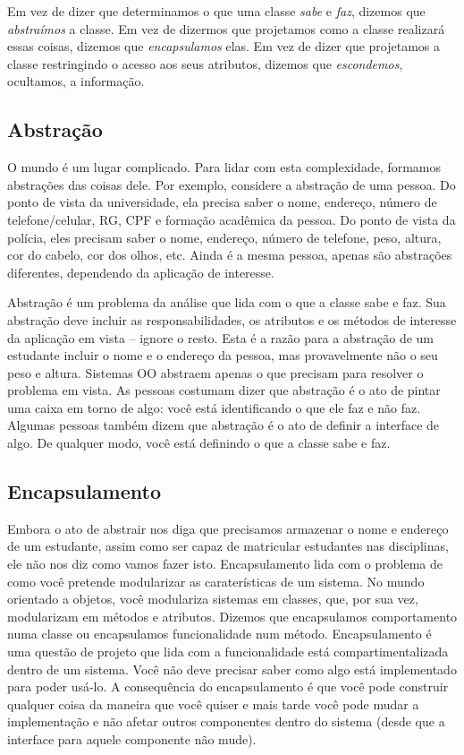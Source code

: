 Em vez de dizer que determinamos o que uma classe \textit{sabe} e \textit{faz}, dizemos que \emph{abstraímos} a classe. Em vez de dizermos que projetamos como a classe realizará essas coisas, dizemos que \emph{encapsulamos} elas. Em vez de dizer que projetamos a classe restringindo o acesso aos seus atributos, dizemos que \emph{escondemos}, ocultamos, a informação.

\subsection{Abstração}

O mundo é um lugar complicado. Para lidar com esta complexidade, formamos abstrações das coisas dele. Por exemplo, considere a abstração de uma pessoa. Do ponto de vista da universidade, ela precisa saber o nome, endereço, número de telefone/celular, RG, CPF e formação acadêmica da pessoa. Do ponto de vista da polícia, eles precisam saber o nome, endereço, número de telefone, peso, altura, cor do cabelo, cor dos olhos, etc. Ainda é a mesma pessoa, apenas são abstrações diferentes, dependendo da aplicação de interesse.

Abstração é um problema da análise que lida com o que a classe sabe e faz. Sua abstração deve incluir as responsabilidades, os atributos e os métodos de interesse da aplicação em vista -- ignore o resto. Esta é a razão para a abstração de um estudante incluir o nome e o endereço da pessoa, mas provavelmente não o seu peso e altura. Sistemas OO abstraem apenas o que precisam para resolver o problema em vista. As pessoas costumam dizer que abstração é o ato de pintar uma caixa em torno de algo: você está identificando o que ele faz e não faz. Algumas pessoas também dizem que abstração é o ato de definir a interface de algo. De qualquer modo, você está definindo o que a classe sabe e faz.

\subsection{Encapsulamento}

Embora o ato de abstrair nos diga que precisamos armazenar o nome e endereço de um estudante, assim como ser capaz de matricular estudantes nas disciplinas, ele não nos diz como vamos fazer isto. Encapsulamento lida com o problema de como você pretende modularizar as caraterísticas de um sistema. No mundo orientado a objetos, você modulariza sistemas em classes, que, por sua vez, modularizam em métodos e atributos. Dizemos que encapsulamos comportamento numa classe ou encapsulamos funcionalidade num método. Encapsulamento é uma questão de projeto que lida com a funcionalidade está compartimentalizada dentro de um sistema. Você não deve precisar saber como algo está implementado para poder usá-lo. A consequência do encapsulamento é que você pode construir qualquer coisa da maneira que você quiser e mais tarde você pode mudar a implementação e não afetar outros componentes dentro do sistema (desde que a interface para aquele componente não mude).

